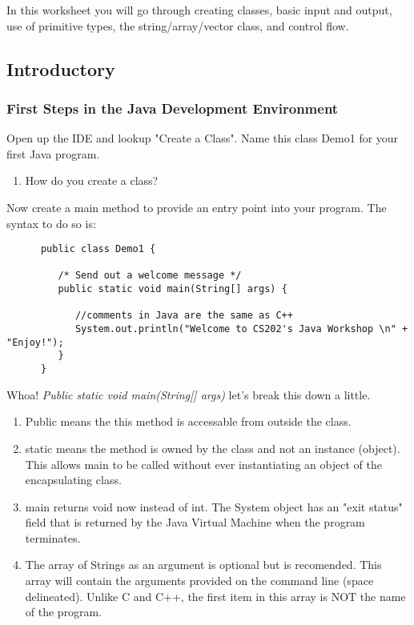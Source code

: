 \documentclass[../../main.tex]{subfiles}
\begin{document}
In this worksheet you will go through creating classes, basic input and output,
use of primitive types, the string/array/vector class, and control flow.
\subsection{Introductory}
\subsubsection{First Steps in the Java Development Environment}
\begin{steps}
   \item Open up the IDE and lookup "Create a Class". Name this class Demo1 for your first Java program.
   \begin{enumerate}[label=\Alph*.]
   \item How do you create a class?
   \end{enumerate} 
   \item Now create a main method to provide an entry point into your program. The syntax to do so is: \\
      \begin{verbatim}
      public class Demo1 {

         /* Send out a welcome message */
         public static void main(String[] args) {

            //comments in Java are the same as C++
            System.out.println("Welcome to CS202's Java Workshop \n" + "Enjoy!");
         }
      }
\end{verbatim}
   Whoa! \emph{Public static void main(String[] args)} let's break this down a little.
   \begin{enumerate}[label=\Alph*.]
   \item Public means the this method is accessable from outside the class.
   \item static means the method is owned by the class and not an instance (object). This allows main to be called without ever instantiating an object of the encapsulating class.
   \item main returns void now instead of int. The System object has an "exit status" field that is returned by the Java Virtual Machine when the program terminates.
   \item The array of Strings as an argument is optional but is recomended. This array will contain the arguments provided on the command line (space delineated). Unlike C and C++, the first item in this array is NOT the name of the program.
   \end{enumerate} 


\end{steps}
\end{document}
